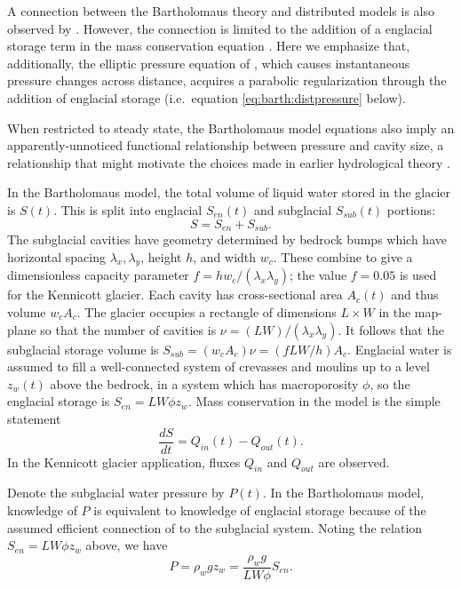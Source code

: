 \documentclass[review,letterpaper]{igs}
\begin{document}
A connection between the Bartholomaus theory and distributed models is also observed by \cite{Hewitt2013}.  However, the connection is limited to the addition of a englacial storage term in the mass conservation equation \cite[equation (7)]{Hewitt2013}.  Here we emphasize that, additionally, the elliptic pressure equation of \cite{Schoofetal2012}, which causes instantaneous pressure changes across distance, acquires a parabolic regularization through the addition of englacial storage (i.e.~equation \eqref{eq:barth:distpressure} below).

When restricted to steady state, the Bartholomaus model equations also imply an apparently-unnoticed functional relationship between pressure and cavity size, a relationship that might motivate the choices made in earlier hydrological theory \citep{FlowersClarke2002_theory}.
 
In the Bartholomaus model, the total volume of liquid water stored in the glacier is $S(t)$.  This is split into englacial $S_{en}(t)$ and subglacial $S_{sub}(t)$ portions:
\begin{equation}
S = S_{en} + S_{sub}.  \label{eq:barth:kinematics}
\end{equation}
The subglacial cavities have geometry determined by bedrock bumps which have horizontal spacing $\lambda_x,\lambda_y$, height $h$, and width $w_c$.  These combine to give a dimensionless capacity parameter $f=h w_c/(\lambda_x \lambda_y)$; the value $f=0.05$ is used for the Kennicott glacier.  Each cavity has cross-sectional area $A_c(t)$ and thus volume $w_c A_c$.  The glacier occupies a rectangle of dimensions $L\times W$ in the map-plane so that the number of cavities is $\nu = (LW)/(\lambda_x\lambda_y)$.  It follows that the subglacial storage volume is $S_{sub} = (w_c A_c) \nu = (f L W/h) A_c$.  Englacial water is assumed to fill a well-connected system of crevasses and moulins up to a level $z_w(t)$ above the bedrock, in a system which has macroporosity $\phi$, so the englacial storage is $S_{en}=L W \phi z_w$.  Mass conservation in the model is the simple statement \citep{Bartholomausetal2008}
\begin{equation}
\frac{dS}{dt} = Q_{in}(t) - Q_{out}(t). \label{eq:barth:massconserve}
\end{equation}
In the Kennicott glacier application, fluxes $Q_{in}$ and $Q_{out}$ are observed.

Denote the subglacial water pressure by $P(t)$.  In the Bartholomaus model, knowledge of $P$ is equivalent to knowledge of englacial storage because of the assumed efficient connection of to the subglacial system.  Noting the relation $S_{en}=L W \phi z_w$ above, we have
\begin{equation}
P = \rho_w g z_w = \frac{\rho_w g}{LW\phi} S_{en}.  \label{eq:barth:englacialpressure}
\end{equation}
\end{document}
